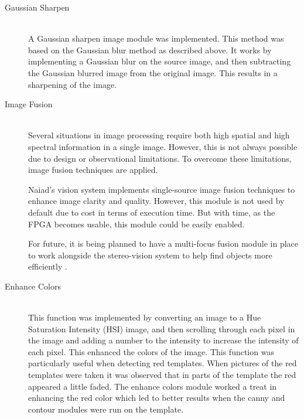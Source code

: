 \begin{description}
\item[Gaussian Sharpen]\hfill \\
A Gaussian sharpen image module was implemented. This method was based on the Gaussian blur method as described above. It works by implementing a Gaussian blur on the source image, and then subtracting the Gaussian blurred image from the original image. This results in a sharpening of the image. 

\item[Image Fusion]\hfill \\
Several situations in image processing require both high spatial and high spectral information in a single image. However, this is not always possible due to design or observational limitations.
To overcome these limitations, image fusion techniques are applied.

Naiad's vision system implements single-source image fusion techniques to enhance image clarity and quality. However, this module is not used by default due to cost in terms of execution time. But with time, as the FPGA becomes usable, this module could be easily enabled.

For future, it is being planned to have a multi-focus fusion module in place to work alongside the stereo-vision system to help find objects more efficiently \cite{article:Zheng2010 , article:Zhang2010 , article:Shutao}.

\item[Enhance Colors]\hfill \\
This function was implemented by converting an image to a Hue Saturation Intensity (HSI) image, and then scrolling through each pixel in the image and adding a number to the intensity to increase the intensity of each pixel. This enhanced the colors of the image. This function was particularly useful when detecting red templates. When pictures of the red templates were taken it was observed that in parts of the template the red appeared a little faded. The enhance colors module worked a treat in enhancing the red color which led to better results when the canny and contour modules were run on the template. 
\end{description}

